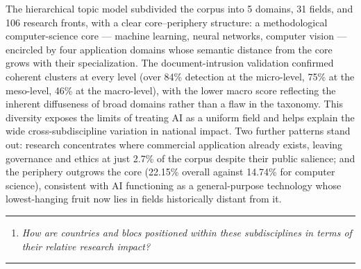 \documentclass{article}
\begin{document}
	The hierarchical topic model subdivided the corpus into 5 domains, 31 fields, and 106 research fronts, with a clear core--periphery structure: a methodological computer-science core --- machine learning, neural networks, computer vision --- encircled by four application domains whose semantic distance from the core grows with their specialization. The document-intrusion validation confirmed coherent clusters at every level (over 84\% detection at the micro-level, 75\% at the meso-level, 46\% at the macro-level), with the lower macro score reflecting the inherent diffuseness of broad domains rather than a flaw in the taxonomy. This diversity exposes the limits of treating AI as a uniform field and helps explain the wide cross-subdiscipline variation in national impact. Two further patterns stand out: research concentrates where commercial application already exists, leaving governance and ethics at just 2.7\% of the corpus despite their public salience; and the periphery outgrows the core (22.15\% overall against 14.74\% for computer science), consistent with AI functioning as a general-purpose technology whose lowest-hanging fruit now lies in fields historically distant from it.
	
	\vspace{1em}
	\rule{\linewidth}{0.4pt}
	\begin{enumerate}
		\item[\textbf{RQ2}]\hspace*{2em}\parbox[t]{\dimexpr\linewidth-2em}{
			\textit{How are countries and blocs positioned within these subdisciplines in terms of their relative research impact?}
		}
	\end{enumerate}
	\vspace{0.25em}
	\rule{\linewidth}{0.4pt}
	\vspace{1em}
	
\end{document}
